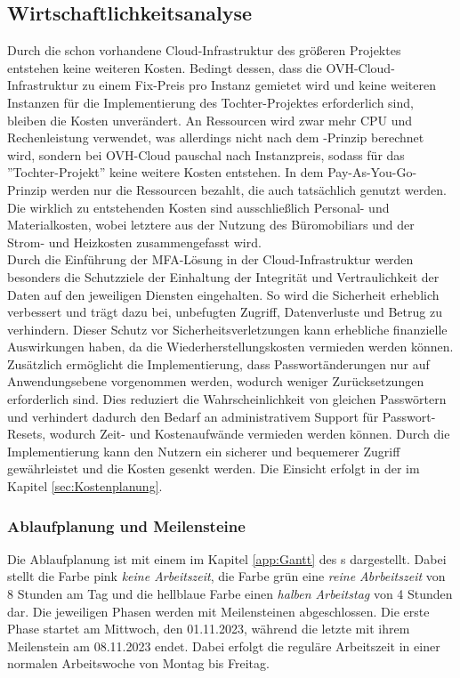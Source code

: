 \subsection{Wirtschaftlichkeitsanalyse}
\label{sec:Wirtschaftlichkeitsanalyse}
Durch die schon vorhandene Cloud-Infrastruktur des größeren Projektes entstehen keine weiteren Kosten. Bedingt dessen, dass die 
OVH-Cloud-Infrastruktur zu einem Fix-Preis pro Instanz gemietet wird und keine weiteren Instanzen für die Implementierung 
des Tochter-Projektes erforderlich sind, bleiben die Kosten unverändert. 
An Ressourcen wird zwar mehr \acs{CPU} und Rechenleistung verwendet, was allerdings nicht nach dem \cite{Wiki}-Prinzip 
berechnet wird, sondern bei OVH-Cloud pauschal nach Instanzpreis, sodass für das ''Tochter-Projekt'' keine weitere 
Kosten entstehen. In dem Pay-As-You-Go-Prinzip werden nur die Ressourcen bezahlt, die auch tatsächlich genutzt werden. 
Die wirklich zu entstehenden Kosten sind ausschließlich Personal- und Materialkosten, wobei letztere 
aus der Nutzung des Büromobiliars und der Strom- und Heizkosten zusammengefasst wird. 
\\Durch die Einführung der \acs{MFA}-Lösung in der Cloud-Infrastruktur werden besonders die Schutzziele der 
Einhaltung der Integrität und Vertraulichkeit der Daten auf den jeweiligen Diensten eingehalten. So wird die Sicherheit 
erheblich verbessert und trägt dazu bei, unbefugten Zugriff, Datenverluste und Betrug zu verhindern. Dieser Schutz 
vor Sicherheitsverletzungen kann erhebliche finanzielle Auswirkungen haben, da die Wiederherstellungskosten vermieden 
werden können. Zusätzlich ermöglicht die Implementierung, dass Passwortänderungen nur auf Anwendungsebene vorgenommen 
werden, wodurch weniger Zurücksetzungen erforderlich sind. Dies reduziert die Wahrscheinlichkeit von gleichen Passwörtern 
und verhindert dadurch den Bedarf an administrativem Support für Passwort-Resets, wodurch Zeit- und Kostenaufwände vermieden 
werden können. Durch die Implementierung kann den Nutzern ein sicherer und bequemerer Zugriff gewährleistet und die Kosten gesenkt werden. 
Die Einsicht erfolgt in der  im Kapitel \ref{sec:Kostenplanung}.

\subsubsection{Ablaufplanung und Meilensteine}
\label{sec:Ablaufplaung und Meilensteine}
Die Ablaufplanung ist mit einem  im Kapitel \ref{app:Gantt} des s dargestellt. 
Dabei stellt die Farbe pink \textit{keine Arbeitszeit}, die Farbe grün eine \textit{reine Abrbeitszeit} 
von 8 Stunden am Tag und die hellblaue Farbe einen \textit{halben Arbeitstag} von 4 Stunden dar. Die jeweiligen Phasen 
werden mit Meilensteinen abgeschlossen. Die erste Phase startet am Mittwoch, den 01.11.2023, während die letzte 
mit ihrem Meilenstein am 08.11.2023 endet. Dabei erfolgt die reguläre Arbeitszeit in einer normalen Arbeitswoche 
von Montag bis Freitag.

